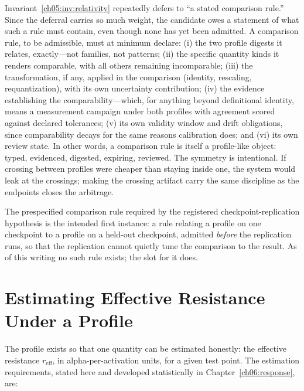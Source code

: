 Invariant~\ref{ch05:inv:relativity} repeatedly defers to ``a stated
comparison rule.'' Since the deferral carries so much weight, the candidate
owes a statement of what such a rule must contain, even though none has yet
been admitted. A comparison rule, to be admissible, must at minimum
declare: (i) the two profile digests it relates, exactly---not families,
not patterns; (ii) the specific quantity kinds it renders comparable, with
all others remaining incomparable; (iii) the transformation, if any,
applied in the comparison (identity, rescaling, requantization), with its
own uncertainty contribution; (iv) the evidence establishing the
comparability---which, for anything beyond definitional identity, means a
measurement campaign under both profiles with agreement scored against
declared tolerances; (v) its own validity window and drift obligations,
since comparability decays for the same reasons calibration does; and (vi)
its own review state. In other words, a comparison rule is itself a
profile-like object: typed, evidenced, digested, expiring, reviewed. The
symmetry is intentional. If crossing between profiles were cheaper than
staying inside one, the system would leak at the crossings; making the
crossing artifact carry the same discipline as the endpoints closes the
arbitrage.

\begin{remark}\label{ch05:rem:comparison}
The prespecified comparison rule required by the registered
checkpoint-replication hypothesis is the intended first instance: a rule
relating a profile on one checkpoint to a profile on a held-out checkpoint,
admitted \emph{before} the replication runs, so that the replication cannot
quietly tune the comparison to the result. As of this writing no such rule
exists; the slot for it does.
\end{remark}

\section{Estimating Effective Resistance Under a Profile}\label{ch05:reff}

The profile exists so that one quantity can be estimated honestly: the
effective resistance $r_{\mathrm{eff}}$, in alpha-per-activation units, for
a given test point. The estimation requirements, stated here and developed
statistically in Chapter~\ref{ch06:response}, are:

